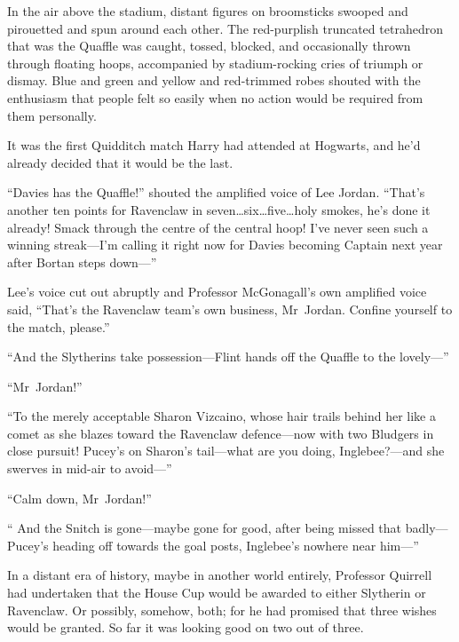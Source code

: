 \later

In the air above the stadium, distant figures on broomsticks swooped and pirouetted and spun around each other. The red-purplish truncated tetrahedron that was the Quaffle was caught, tossed, blocked, and occasionally thrown through floating hoops, accompanied by stadium-rocking cries of triumph or dismay. Blue and green and yellow and red-trimmed robes shouted with the enthusiasm that people felt so easily when no action would be required from them personally.

It was the first Quidditch match Harry had attended at Hogwarts, and he’d already decided that it would be the last.

“Davies has the Quaffle!” shouted the amplified voice of Lee Jordan. “That’s another ten points for Ravenclaw in seven…six…five…holy smokes, he’s done it already! Smack through the centre of the central hoop! I’ve never seen such a winning streak—I’m calling it right now for Davies becoming Captain next year after Bortan steps down—”

Lee’s voice cut out abruptly and Professor McGonagall’s own amplified voice said, “That’s the Ravenclaw team’s own business, Mr~Jordan. Confine yourself to the match, please.”

“And the Slytherins take possession—Flint hands off the Quaffle to the lovely—”

“Mr~Jordan!”

“To the merely acceptable Sharon Vizcaino, whose hair trails behind her like a comet as she blazes toward the Ravenclaw defence—now with two Bludgers in close pursuit! Pucey’s on Sharon’s tail—what are you doing, Inglebee?—and she swerves in mid-air to avoid—”

“Calm down, Mr~Jordan!”

“ And the Snitch is gone—maybe gone for good, after being missed that badly—Pucey’s heading off towards the goal posts, Inglebee’s nowhere near him—”

In a distant era of history, maybe in another world entirely, Professor Quirrell had undertaken that the House Cup would be awarded to either Slytherin or Ravenclaw. Or possibly, somehow, both; for he had promised that three wishes would be granted. So far it was looking good on two out of three.

